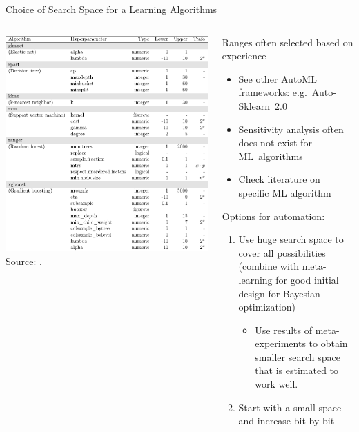 	  \begin{frame}{Choice of Search Space for a Learning Algorithms}
		\begin{columns}
			
			\begin{column}{0.4\textwidth}
				\begin{center}
						\includegraphics[width = 0.8\linewidth]{images/probst2019jmlr_tab1.pdf}
					{\tiny Source: .}
				\end{center}
			\end{column}
			
		  \begin{column}{0.6\textwidth}
		  
		  Ranges often selected based on experience
		  \begin{itemize}
	  
			\item See other AutoML frameworks: e.g.\ Auto-Sklearn~2.0 
	  
			\item Sensitivity analysis often does not exist for ML~algorithms
			\item Check literature on specific ML algorithm
		  \end{itemize}
		  Options for automation:
		  \begin{enumerate}
			\item Use huge search space to cover all possibilities \\ 
				  (combine with meta-learning for good initial design for Bayesian optimization)
			\begin{itemize} 
					\item Use results of meta-experiments to obtain smaller search space that is estimated to work well.
			 \end{itemize}
			   \item Start with a small space and increase bit by bit
		  \end{enumerate}
		  \end{column}%
	  

\end{columns}
\end{frame}
